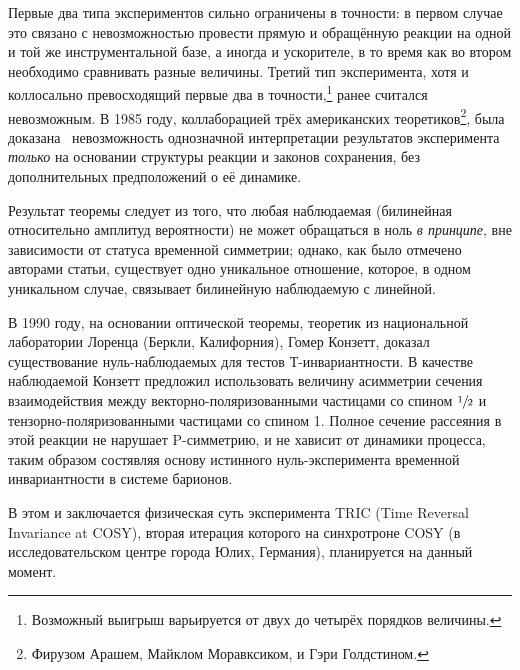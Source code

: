 \documentclass[14pt]{extarticle}
\begin{document}
Первые два типа экспериментов сильно ограничены в точности: в первом случае это связано с невозможностью провести прямую и обращённую реакции на одной и той же инструментальной базе, а иногда и ускорителе, в то время как во втором необходимо сравнивать разные величины. Третий тип эксперимента, хотя и коллосально превосходящий первые два в точности,\footnote{Возможный выигрыш варьируется от двух до четырёх порядков величины.} ранее считался невозможным. В 1985 году, коллаборацией трёх американских теоретиков\footnote{Фирузом Арашем, Майклом Моравксиком, и Гэри Голдстином.}, была доказана~\cite{Goldstein} невозможность однозначной интерпретации результатов эксперимента \emph{только} на основании структуры реакции и законов сохранения, без дополнительных предположений о её динамике. 

Результат теоремы следует из того, что любая наблюдаемая (билинейная относительно амплитуд вероятности)  не может обращаться в ноль \emph{в принципе}, вне зависимости от статуса временной симметрии; однако, как было отмечено авторами статьи, существует одно уникальное отношение, которое, в одном уникальном случае, связывает билинейную наблюдаемую с линейной. 

В 1990 году, на основании оптической теоремы, теоретик из национальной лаборатории Лоренца (Беркли, Калифорния), Гомер Конзетт, доказал~\cite{Conzett} существование нуль-наблюдаемых для тестов Т-инвариантности. В качестве наблюдаемой Конзетт предложил использовать величину асимметрии сечения взаимодействия между векторно-поляризованными частицами со спином $\sfrac{1}{2}$ и тензорно-поляризованными частицами со спином 1. Полное сечение рассеяния в этой реакции не нарушает P-симметрию, и не хависит от динамики процесса, таким образом состявляя основу истинного нуль-эксперимента временной инвариантности в системе барионов.

В этом и заключается физическая суть эксперимента TRIC (Time Reversal Invariance at COSY), вторая итерация которого на синхротроне COSY (в исследовательском центре города Юлих, Германия), планируется на данный момент. 

%
%
\end{document}
